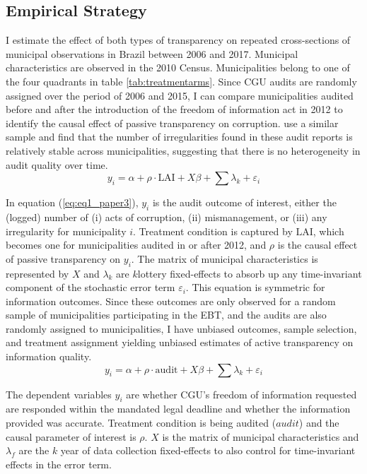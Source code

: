 \documentclass[11pt]{article}
\newcommand{\refp}[1]{(\ref{#1})}
\begin{document}
\subsection{Empirical Strategy} \label{subsec:methods_paper3}

I estimate the effect of both types of transparency on repeated cross-sections of municipal observations in Brazil between 2006 and 2017. Municipal characteristics are observed in the 2010 Census. Municipalities belong to one of the four quadrants in table \ref{tab:treatmentarms}. Since CGU audits are randomly assigned over the period of 2006 and 2015, I can compare municipalities audited before and after the introduction of the freedom of information act in 2012 to identify the causal effect of passive transparency on corruption. \citet{AvisGovernmentAuditsReduce2018} use a similar sample and find that the number of irregularities found in these audit reports is relatively stable across municipalities, suggesting that there is no heterogeneity in audit quality over time.
\begin{equation} \label{eq:eq1_paper3}
  y_{i} = \alpha + \rho \cdot \text{LAI} + X \beta + \sum \lambda_{k} + \varepsilon_{i}
\end{equation}

In equation \refp{eq:eq1_paper3}, $y_{i}$ is the audit outcome of interest, either the (logged) number of (i) acts of corruption, (ii) mismanagement, or (iii) any irregularity for municipality $i$. Treatment condition is captured by $\text{LAI}$, which becomes one for municipalities audited in or after 2012, and $\rho$ is the causal effect of passive transparency on $y_{i}$. The matrix of municipal characteristics is represented by $X$ and $\lambda_{k}$ are $k$lottery fixed-effects to absorb up any time-invariant component of the stochastic error term $\varepsilon_{i}$. This equation is symmetric for information outcomes. Since these outcomes are only observed for a random sample of municipalities participating in the EBT, and the audits are also randomly assigned to municipalities, I have unbiased outcomes, sample selection, and treatment assignment yielding unbiased estimates of active transparency on information quality.
\begin{equation} \label{eq:eq2_paper3}
  y_{i} = \alpha + \rho \cdot \text{audit} + X \beta + \sum \lambda_{k} + \varepsilon_{i}
\end{equation}

The dependent variables $y_{i}$ are whether CGU's freedom of information requested are responded within the mandated legal deadline and whether the information provided was accurate. Treatment condition is being audited ($audit$) and the causal parameter of interest is $\rho$. $X$ is the matrix of municipal characteristics and $\lambda_{f}$ are the $k$ year of data collection fixed-effects to also control for time-invariant effects in the error term.
\end{document}

